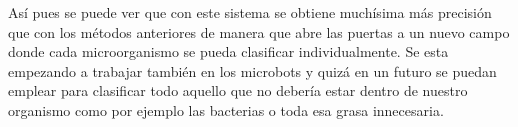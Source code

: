 \documentclass[a4paper, 12pt, UTF8]{article}
\begin{document}
Así pues se puede ver que con este sistema se obtiene muchísima más precisión que con los métodos anteriores de manera que abre las puertas a un nuevo campo donde cada microorganismo se pueda clasificar individualmente. Se esta empezando a trabajar también en los microbots \cite{microbots} y quizá en un futuro se puedan emplear para clasificar todo aquello que no debería estar dentro de nuestro organismo como por ejemplo las bacterias o toda esa grasa innecesaria. 

\printbibliography
\end{document}
